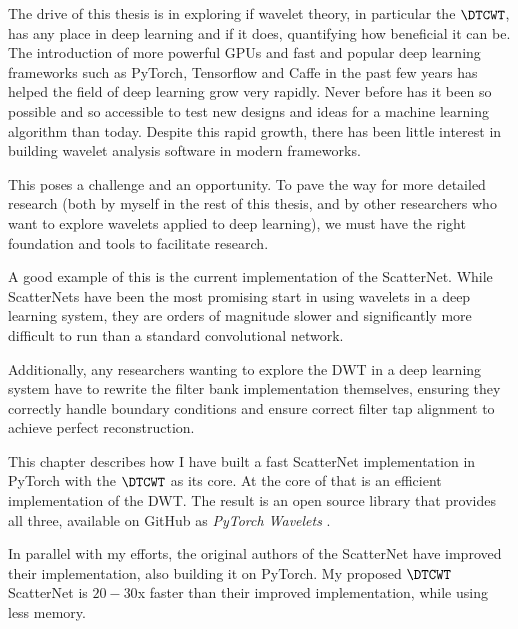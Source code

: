 The drive of this thesis is in exploring if wavelet theory, in
particular the $\DTCWT$, has any place in deep learning and if it does,
quantifying how beneficial it can be. The introduction of more powerful GPUs and
fast and popular deep learning frameworks such as PyTorch, Tensorflow and Caffe
in the past few years has helped the field of deep learning grow very rapidly.
Never before has it been so possible and so accessible to test new designs and
ideas for a machine learning algorithm than today. Despite this rapid growth,
there has been little interest in building wavelet analysis software in modern
frameworks. 

This poses a challenge and an opportunity. To pave the way for more detailed 
research (both by myself in the rest of this thesis, and by other researchers
who want to explore wavelets applied to deep learning), we must have the right
foundation and tools to facilitate research.

A good example of this is the current implementation of the ScatterNet. While
ScatterNets have been the most promising start in using wavelets in a deep
learning system, they are orders of magnitude slower and significantly more
difficult to run than a standard convolutional network. 

Additionally, any researchers wanting to explore the DWT in a deep learning
system have to rewrite the filter bank implementation themselves, ensuring they
correctly handle boundary conditions and ensure correct filter tap alignment to
achieve perfect reconstruction.

This chapter describes how I have built a fast ScatterNet implementation in 
PyTorch with the $\DTCWT$ as its core. At the core of that is an efficient 
implementation of the DWT\@. The result is an open source library that provides
all three, available on GitHub as \emph{PyTorch Wavelets} \cite{}.

In parallel with my efforts, the original authors of the ScatterNet have
improved their implementation, also building it on PyTorch. My proposed
$\DTCWT$ ScatterNet is $20-30$x faster than their improved implementation,
while using less memory. 

